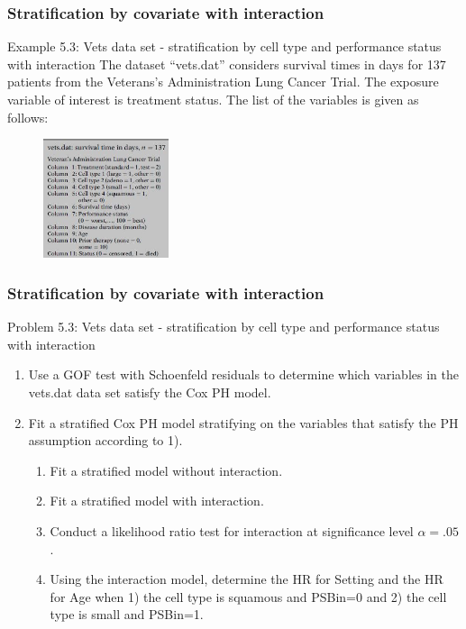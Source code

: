 \documentclass{beamer}
\theoremstyle{definition}
\begin{document}
\begin{frame}
\frametitle{Stratification by covariate with interaction}
\begin{block}{Example 5.3: Vets data set - stratification by cell type and performance status with interaction}
The dataset ``vets.dat'' considers survival times in days for 137 patients from the Veterans's Administration Lung Cancer Trial. The exposure variable of interest is treatment status.
The list of the variables is given as follows:
\begin{figure}
    \centering
    \includegraphics[height=3.5cm]{Ch5_vets.JPG}
  \end{figure}
\end{block}
\end{frame}

\begin{frame}
\frametitle{Stratification by covariate with interaction}
\begin{block}{Problem 5.3: Vets data set - stratification by cell type and performance status with interaction}
\begin{enumerate}
\item Use a GOF test with Schoenfeld residuals to determine which variables in the vets.dat data set satisfy the Cox PH model.
\item Fit a stratified Cox PH model stratifying on the variables that satisfy the PH assumption according to 1).
 \begin{enumerate}
 \item Fit a stratified model without interaction.
 \item Fit a stratified model with interaction.
\item Conduct a likelihood ratio test for interaction at significance level $\alpha=.05$.
\item Using the interaction model, determine the HR for Setting and the HR for Age when 1) the cell type is squamous and PSBin=0 and 2) the cell type is small and PSBin=1.
\end{enumerate}
\end{enumerate}
\end{block}
\end{frame}
\end{document}
